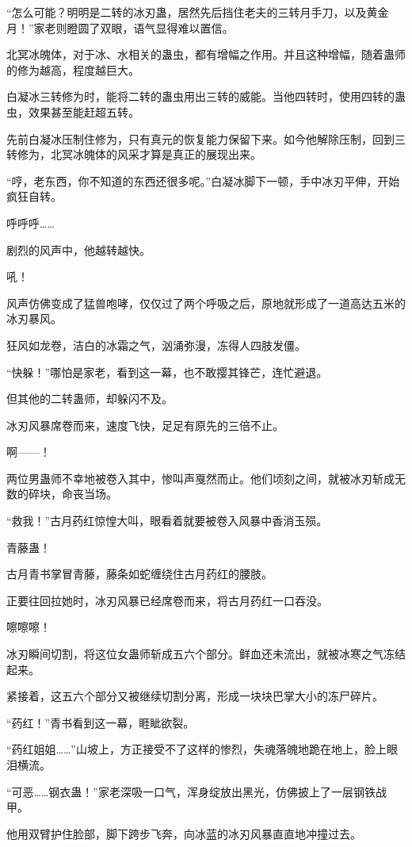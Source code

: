 \begin{this_body}
“怎么可能？明明是二转的冰刃蛊，居然先后挡住老夫的三转月手刀，以及黄金月！”家老则瞪圆了双眼，语气显得难以置信。

北冥冰魄体，对于冰、水相关的蛊虫，都有增幅之作用。并且这种增幅，随着蛊师的修为越高，程度越巨大。

白凝冰三转修为时，能将二转的蛊虫用出三转的威能。当他四转时，使用四转的蛊虫，效果甚至能赶超五转。

先前白凝冰压制住修为，只有真元的恢复能力保留下来。如今他解除压制，回到三转修为，北冥冰魄体的风采才算是真正的展现出来。

“哼，老东西，你不知道的东西还很多呢。”白凝冰脚下一顿，手中冰刃平伸，开始疯狂自转。

呼呼呼……

剧烈的风声中，他越转越快。

吼！

风声仿佛变成了猛兽咆哮，仅仅过了两个呼吸之后，原地就形成了一道高达五米的冰刃暴风。

狂风如龙卷，洁白的冰霜之气，汹涌弥漫，冻得人四肢发僵。

“快躲！”哪怕是家老，看到这一幕，也不敢撄其锋芒，连忙避退。

但其他的二转蛊师，却躲闪不及。

冰刃风暴席卷而来，速度飞快，足足有原先的三倍不止。

啊——！

两位男蛊师不幸地被卷入其中，惨叫声戛然而止。他们顷刻之间，就被冰刃斩成无数的碎块，命丧当场。

“救我！”古月药红惊惶大叫，眼看着就要被卷入风暴中香消玉殒。

青藤蛊！

古月青书掌冒青藤，藤条如蛇缠绕住古月药红的腰肢。

正要往回拉她时，冰刃风暴已经席卷而来，将古月药红一口吞没。

嚓嚓嚓！

冰刃瞬间切割，将这位女蛊师斩成五六个部分。鲜血还未流出，就被冰寒之气冻结起来。

紧接着，这五六个部分又被继续切割分离，形成一块块巴掌大小的冻尸碎片。

“药红！”青书看到这一幕，睚眦欲裂。

“药红姐姐……”山坡上，方正接受不了这样的惨烈，失魂落魄地跪在地上，脸上眼泪横流。

“可恶……钢衣蛊！”家老深吸一口气，浑身绽放出黑光，仿佛披上了一层钢铁战甲。

他用双臂护住脸部，脚下跨步飞奔，向冰蓝的冰刃风暴直直地冲撞过去。


\end{this_body}
